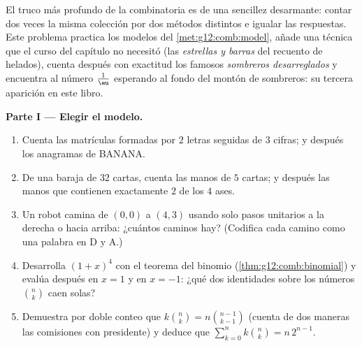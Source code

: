 \begin{problem}
\label{pb:g12:comb:1}
El truco más profundo de la combinatoria es de una sencillez desarmante:
contar dos veces la misma colección por dos métodos distintos e igualar las
respuestas. Este problema practica los modelos del
\cref{met:g12:comb:model}, añade una técnica que el curso del capítulo no
necesitó (las \emph{estrellas y barras} del recuento de helados), cuenta
después con exactitud los famosos \emph{sombreros desarreglados} y encuentra
al número $\frac1\eu$ esperando al fondo del montón de sombreros: su tercera
aparición en este libro.

\medskip
\noindent\textbf{Parte I --- Elegir el modelo.}
\begin{enumerate}
  \item Cuenta las matrículas formadas por $2$ letras seguidas de $3$
        cifras; y después los anagramas de BANANA.
  \item De una baraja de $32$ cartas, cuenta las manos de $5$ cartas; y
        después las manos que contienen exactamente $2$ de los $4$ ases.
  \item Un robot camina de $(0,0)$ a $(4,3)$ usando solo pasos unitarios a
        la derecha o hacia arriba: ¿cuántos caminos hay? (Codifica cada
        camino como una palabra en D y A.)
  \item Desarrolla $(1 + x)^4$ con el teorema del binomio
        (\cref{thm:g12:comb:binomial}) y evalúa después en $x = 1$ y en
        $x = -1$: ¿qué dos identidades sobre los números $\binom nk$ caen
        solas?
  \item Demuestra por doble conteo que $k\binom nk = n\binom{n-1}{k-1}$
        (cuenta de dos maneras las comisiones con presidente) y deduce que
        $\sum_{k=0}^{n} k\binom nk = n\,2^{n-1}$.
\end{enumerate}


\end{problem}

